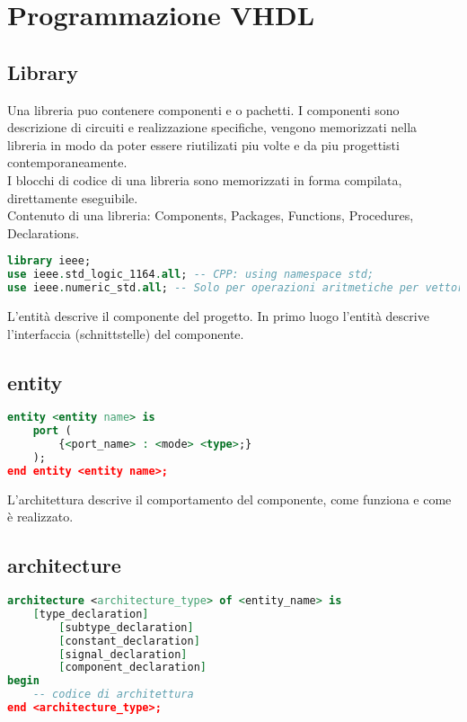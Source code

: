\section{Programmazione VHDL}
    \subsection{Library}
        Una libreria puo contenere componenti e o pachetti. I componenti sono descrizione di circuiti e realizzazione specifiche,
        vengono memorizzati nella libreria in modo da poter essere riutilizati piu volte e da piu progettisti contemporaneamente.\\
        I blocchi di codice di una libreria sono memorizzati in forma compilata, direttamente eseguibile.\\
        Contenuto di una libreria: Components, Packages, Functions, Procedures, Declarations.
        \begin{lstlisting}[language=VHDL]
library ieee; 
use ieee.std_logic_1164.all; -- CPP: using namespace std;
use ieee.numeric_std.all; -- Solo per operazioni aritmetiche per vettori
        \end{lstlisting}


    L'entità descrive il componente del progetto.
    In primo luogo l'entità descrive l'interfaccia (schnittstelle) del componente.
    \subsection{entity}
        \begin{lstlisting}[language=VHDL]
entity <entity name> is
    port (
        {<port_name> : <mode> <type>;}
    );
end entity <entity name>;
        \end{lstlisting}

    L'architettura descrive il comportamento del componente, come funziona e come è realizzato.
    \subsection{architecture}
        \begin{lstlisting}[language=VHDL, numberstyle=\tiny\color{gray}\highlightlines{1,7,8,9}{green}]
architecture <architecture_type> of <entity_name> is
    [type_declaration]
        [subtype_declaration]
        [constant_declaration]
        [signal_declaration]
        [component_declaration]
begin
    -- codice di architettura
end <architecture_type>;
        \end{lstlisting}

